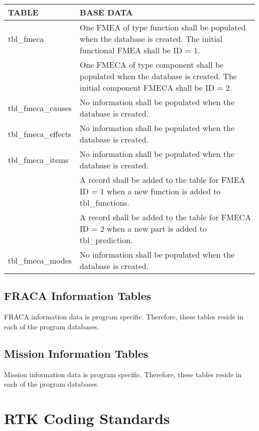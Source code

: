 \documentclass[11pt, 12pt, twoside, onecolumn]{article}
\begin{document}
    \begin{landscape}
    \begin{longtable}{ll}
    TABLE & BASE DATA \\
    \hline
    tbl\_fmeca & One FMEA of type function shall be populated when the database is created. The initial functional FMEA shall be ID = 1. \\
    & One FMECA of type component shall be populated when the database is created.  The initial component FMECA shall be ID = 2. \\
    tbl\_fmeca\_causes & No information shall be populated when the database is created. \\
    tbl\_fmeca\_effects & No information shall be populated when the database is created. \\
    tbl\_fmeca\_items & No information shall be populated when the database is created. \\
    & A record shall be added to the table for FMEA ID = 1 when a new function is added to tbl\_functions. \\
    & A record shall be added to the table for FMECA ID = 2 when a new part is added to tbl\_prediction. \\
    tbl\_fmeca\_modes & No information shall be populated when the database is created. \\
    \hline
    \end{longtable}
    \end{landscape}

\subsection{\bf \large FRACA Information Tables}

\noindent FRACA information data is program specific.  Therefore, these tables reside in each of the program databases.

\subsection{\bf \large Mission Information Tables}

\noindent Mission information data is program specific.  Therefore, these tables reside in each of the program databases.

\section{\bf \Large RTK Coding Standards}
\end{document}
